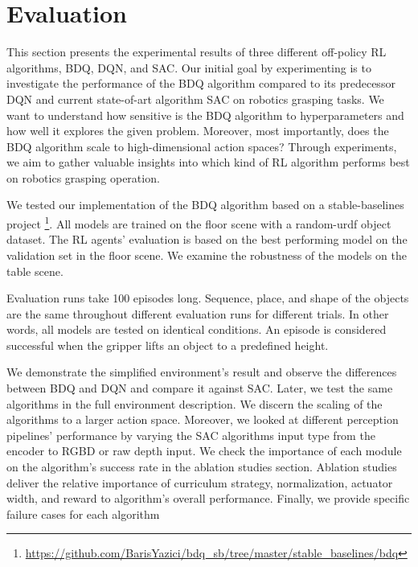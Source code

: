 
\chapter{Evaluation}\label{chapter:evaluation}

This section presents the experimental results of three different off-policy RL algorithms, BDQ, DQN, and SAC. Our initial goal by experimenting is to investigate the performance of the BDQ algorithm compared to its predecessor DQN and current state-of-art algorithm SAC on robotics grasping tasks. We want to understand how sensitive is the BDQ algorithm to hyperparameters and how well it explores the given problem. Moreover, most importantly, does the BDQ algorithm scale to high-dimensional action spaces? Through experiments, we aim to gather valuable insights into which kind of RL algorithm performs best on robotics grasping operation.

We tested our implementation of the BDQ algorithm based on a stable-baselines project \footnote{\url{https://github.com/BarisYazici/bdq_sb/tree/master/stable_baselines/bdq}}. All models are trained on the floor scene with a random-urdf object dataset. The RL agents' evaluation is based on the best performing model on the validation set in the floor scene. We examine the robustness of the models on the table scene.

Evaluation runs take 100 episodes long. Sequence, place, and shape of the objects are the same throughout different evaluation runs for different trials. In other words, all models are tested on identical conditions. An episode is considered successful when the gripper lifts an object to a predefined height.

We demonstrate the simplified environment's result and observe the differences between BDQ and DQN and compare it against SAC. Later, we test the same algorithms in the full environment description. We discern the scaling of the algorithms to a larger action space. Moreover, we looked at different perception pipelines' performance by varying the SAC algorithms input type from the encoder to RGBD or raw depth input. We check the importance of each module on the algorithm's success rate in the ablation studies section.  Ablation studies deliver the relative importance of curriculum strategy, normalization, actuator width, and reward to algorithm's overall performance. Finally, we provide specific failure cases for each algorithm


